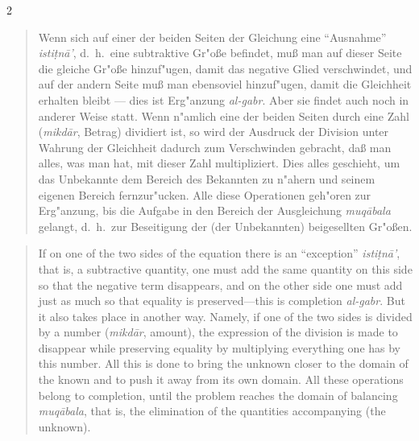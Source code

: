 \documentclass[10pt,a4paper]{article}
\renewcommand{\switchcolumn}{\syncronize\nointerlineskip\columnbreak}
\newcommand{\enquote}[1]{``#1''}
\begin{document}
\begin{paracol}{2}
\begin{quote}
Wenn sich auf einer der beiden Seiten der Gleichung eine \enquote{Ausnahme} \textit{isti\d{t}n\=a'}, d.\ h.\ eine subtraktive Gr"o\ss{}e befindet, mu\ss{} man auf dieser Seite die gleiche Gr"o\ss{}e hinzuf"ugen, damit das negative Glied verschwindet, und auf der andern Seite mu\ss{} man ebensoviel hinzuf"ugen, damit die Gleichheit erhalten bleibt --- dies ist Erg"anzung \textit{al-gabr}. Aber sie findet auch noch in anderer Weise statt. Wenn n"amlich eine der beiden Seiten durch eine Zahl (\textit{mikd\=ar}, Betrag) dividiert ist, so wird der Ausdruck der Division unter Wahrung der Gleichheit dadurch zum Verschwinden gebracht, da\ss{} man alles, was man hat, mit dieser Zahl multipliziert. Dies alles geschieht, um das Unbekannte dem Bereich des Bekannten zu n"ahern und seinem eigenen Bereich fernzur"ucken. Alle diese Operationen geh"oren zur Erg"anzung, bis die Aufgabe in den Bereich der Ausgleichung \textit{muq\=abala} gelangt, d.\ h.\ zur Beseitigung der (der Unbekannten) beigesellten Gr"o\ss{}en.
\end{quote}
\switchcolumn
\begin{quote}
If on one of the two sides of the equation there is an ``exception'' \textit{isti\d{t}n\=a'}, that is, a subtractive quantity, one must add the same quantity on this side so that the negative term disappears, and on the other side one must add just as much so that equality is preserved---this is completion \textit{al-gabr}. But it also takes place in another way. Namely, if one of the two sides is divided by a number (\textit{mikd\=ar}, amount), the expression of the division is made to disappear while preserving equality by multiplying everything one has by this number. All this is done to bring the unknown closer to the domain of the known and to push it away from its own domain. All these operations belong to completion, until the problem reaches the domain of balancing \textit{muq\=abala}, that is, the elimination of the quantities accompanying (the unknown).
\end{quote}
\end{paracol}
\end{document}
